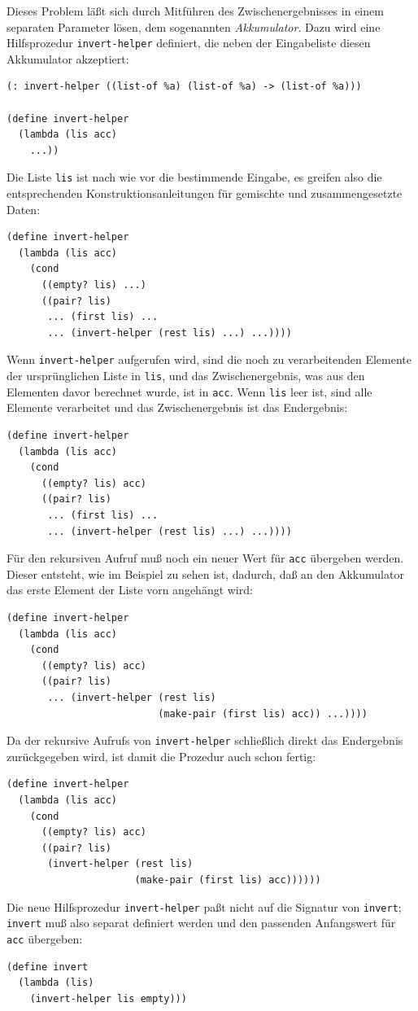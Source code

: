 Dieses Problem läßt sich durch Mitführen des Zwischenergebnisses in
einem separaten Parameter lösen, dem sogenannten
\textit{Akkumulator}.  Dazu wird eine
Hilfsprozedur \texttt{invert-helper} definiert, die neben der Eingabeliste
diesen Akkumulator akzeptiert:
%
\begin{verbatim}
(: invert-helper ((list-of %a) (list-of %a) -> (list-of %a)))

(define invert-helper
  (lambda (lis acc)
    ...))
\end{verbatim}
%
Die Liste \texttt{lis} ist nach wie vor die bestimmende Eingabe, es
greifen also die entsprechenden Konstruktionsanleitungen für gemischte
und zusammengesetzte Daten:
%
\begin{verbatim}
(define invert-helper
  (lambda (lis acc)
    (cond
      ((empty? lis) ...)
      ((pair? lis)
       ... (first lis) ...
       ... (invert-helper (rest lis) ...) ...))))
\end{verbatim}
%
Wenn \texttt{invert-helper} aufgerufen wird, sind die noch zu
verarbeitenden Elemente der ursprünglichen Liste in \texttt{lis}, und
das Zwischenergebnis, was aus den Elementen davor berechnet wurde, ist
in \texttt{acc}.  Wenn \texttt{lis} leer ist, sind alle Elemente
verarbeitet und das Zwischenergebnis ist das Endergebnis:
%
\begin{verbatim}
(define invert-helper
  (lambda (lis acc)
    (cond
      ((empty? lis) acc)
      ((pair? lis)
       ... (first lis) ...
       ... (invert-helper (rest lis) ...) ...))))
\end{verbatim}
%
Für den rekursiven Aufruf muß noch ein neuer Wert für \texttt{acc}
übergeben werden.  Dieser entsteht, wie im Beispiel zu sehen ist,
dadurch, daß an den Akkumulator das erste Element der Liste vorn
angehängt wird:
%
\begin{verbatim}
(define invert-helper
  (lambda (lis acc)
    (cond
      ((empty? lis) acc)
      ((pair? lis)
       ... (invert-helper (rest lis)
                          (make-pair (first lis) acc)) ...))))
\end{verbatim}
%
Da der rekursive Aufrufs von \texttt{invert-helper} schließlich direkt das
Endergebnis zurückgegeben wird, ist damit die Prozedur auch schon fertig:
%
\begin{verbatim}
(define invert-helper
  (lambda (lis acc)
    (cond
      ((empty? lis) acc)
      ((pair? lis)
       (invert-helper (rest lis)
                      (make-pair (first lis) acc))))))
\end{verbatim}
%
Die neue Hilfsprozedur \texttt{invert-helper} paßt nicht auf die Signatur
von \texttt{invert}; \texttt{invert} muß also separat definiert werden
und den passenden Anfangswert für \texttt{acc} übergeben:
%
\begin{verbatim}
(define invert
  (lambda (lis)
    (invert-helper lis empty)))
\end{verbatim}
%

